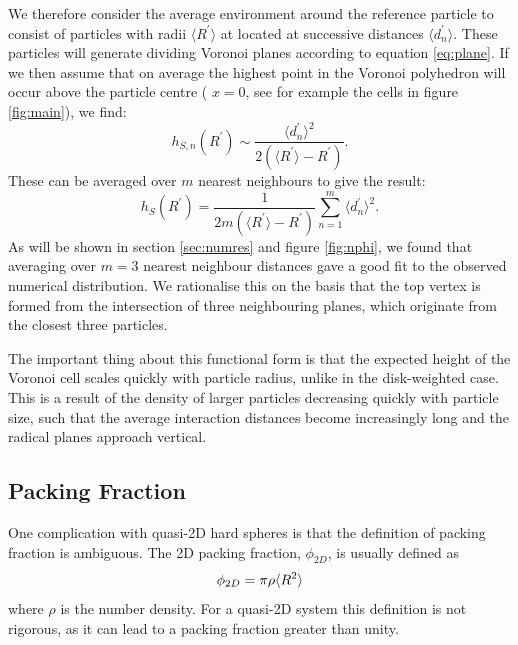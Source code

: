We therefore consider the average environment around the reference particle to consist of particles with radii $\langle R^\prime \rangle$ at located at successive distances $\langle d^\prime_n\rangle$.
These particles will generate dividing Voronoi planes according to equation \eqref{eq:plane}.
If we then assume that on average the highest point in the Voronoi polyhedron will occur above the particle centre (\ie{} $x=0$, see for example the cells in figure \ref{fig:main}), we find:
\begin{equation}
	h_{S,n}\left(R^\prime\right) \sim \frac{\langle d^\prime_n\rangle^2}{2\left(\langle R^\prime \rangle - R^\prime\right)}.
\end{equation}
These can be averaged over $m$ nearest neighbours to give the result:
\begin{equation}
	h_S\left(R^\prime\right) = \frac{1}{2m\left(\langle R^\prime\rangle-R^\prime\right)}\sum\limits_{n=1}^{m} \langle d^\prime_n \rangle^2.
\end{equation} 
As will be shown in section \ref{sec:numres} and figure \ref{fig:nphi}, we  found that averaging over $m=3$ nearest neighbour distances gave a good fit to the observed numerical distribution.
We rationalise this on the basis that the top vertex is formed from the intersection of three neighbouring planes, which originate from the closest three particles.

The important thing about this functional form is that the expected height of the Voronoi cell scales quickly with particle radius, unlike in the disk\--weighted case.
This is a result of the density of larger particles decreasing quickly with particle size, such that the average interaction distances become increasingly long and the radical planes approach vertical.

\subsection{Packing Fraction}
\label{sec:packingfrac}

One complication with quasi\--2D hard spheres is that the definition of packing fraction is ambiguous.
The 2D packing fraction, $\phi_{2D}$, is usually defined as
\begin{equation}
	\label{eq:simplepackingfrac}
	\phi_{2D}=\pi\rho\langle R^2\rangle
\end{equation}
where $\rho$ is the number density.
For a quasi\--2D system this definition is not rigorous, as it can lead to a packing fraction greater than unity.

